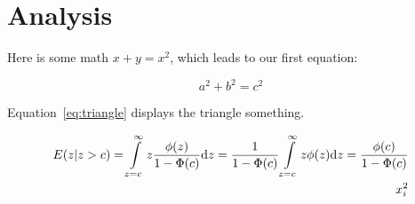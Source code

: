 \section{Analysis}
\label{sec:analysis}

Here is some math $x + y = x^2$, which leads to our first equation:

\begin{equation}
  a^2 + b^2 = c^2
  \label{eq:triangle}
\end{equation}

Equation~\eqref{eq:triangle} displays the triangle something.

\begin{align}
  E(z|z>c) =
  \int\limits_{z=c}^{\infty} z \frac{\phi{(z)}}{1-\Phi(c)} \textnormal{d}z =
  \frac{1}{1-\Phi(c)} \int\limits_{z=c}^{\infty}z\phi(z)\textnormal{d}z =
  \frac{\phi(c)}{1 - \Phi(c)} \nonumber \\
  x_{i}^{2}
\end{align}
